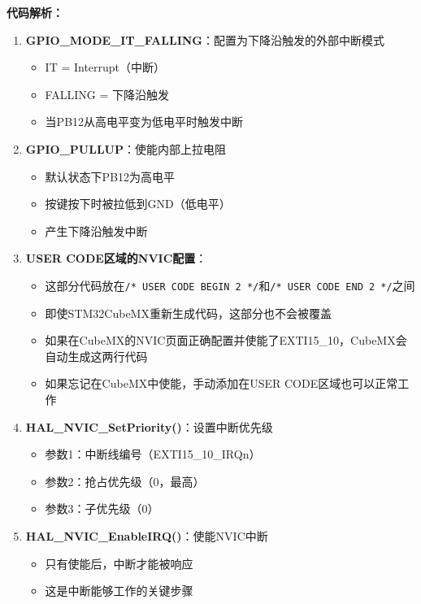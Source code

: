 \documentclass[
  chinese,
  UTF8,
  oneside,
  openany]{ctexbook}
\providecommand{\tightlist}{%
  \setlength{\itemsep}{0pt}\setlength{\parskip}{0pt}}
\begin{document}
\textbf{代码解析：}

\begin{enumerate}
\def\labelenumi{\arabic{enumi}.}
\tightlist
\item
  \textbf{GPIO\_MODE\_IT\_FALLING}：配置为下降沿触发的外部中断模式

  \begin{itemize}
  \tightlist
  \item
    IT = Interrupt（中断）
  \item
    FALLING = 下降沿触发
  \item
    当PB12从高电平变为低电平时触发中断
  \end{itemize}
\item
  \textbf{GPIO\_PULLUP}：使能内部上拉电阻

  \begin{itemize}
  \tightlist
  \item
    默认状态下PB12为高电平
  \item
    按键按下时被拉低到GND（低电平）
  \item
    产生下降沿触发中断
  \end{itemize}
\item
  \textbf{USER CODE区域的NVIC配置}：

  \begin{itemize}
  \tightlist
  \item
    这部分代码放在\texttt{/*\ USER\ CODE\ BEGIN\ 2\ */}和\texttt{/*\ USER\ CODE\ END\ 2\ */}之间
  \item
    即使STM32CubeMX重新生成代码，这部分也不会被覆盖
  \item
    如果在CubeMX的NVIC页面正确配置并使能了EXTI15\_10，CubeMX会自动生成这两行代码
  \item
    如果忘记在CubeMX中使能，手动添加在USER CODE区域也可以正常工作
  \end{itemize}
\item
  \textbf{HAL\_NVIC\_SetPriority()}：设置中断优先级

  \begin{itemize}
  \tightlist
  \item
    参数1：中断线编号（EXTI15\_10\_IRQn）
  \item
    参数2：抢占优先级（0，最高）
  \item
    参数3：子优先级（0）
  \end{itemize}
\item
  \textbf{HAL\_NVIC\_EnableIRQ()}：使能NVIC中断

  \begin{itemize}
  \tightlist
  \item
    只有使能后，中断才能被响应
  \item
    这是中断能够工作的关键步骤
  \end{itemize}
\end{enumerate}
\end{document}
